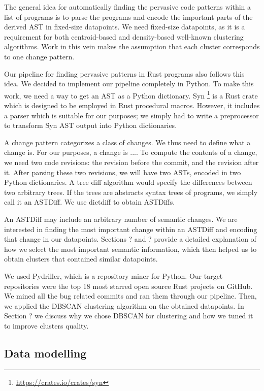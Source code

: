 The general idea for automatically finding the pervasive code patterns within a list of programs is to parse the programs and encode the important parts of the derived AST in fixed-size datapoints. We need fixed-size datapoints, as it is a requirement for both centroid-based and density-based well-known clustering algorithms. Work in this vein makes the assumption that each cluster corresponds to one change pattern.

Our pipeline for finding pervasive patterns in Rust programs also follows this idea. We decided to implement our pipeline completely in Python. To make this work, we need a way to get an AST as a Python dictionary. Syn \footnote{\url{https://crates.io/crates/syn}} is a Rust crate which is designed to be employed in Rust procedural macros. However, it includes a parser which is suitable for our purposes; we simply had to write a preprocessor to transform Syn AST output into Python dictionaries.

A change pattern categorizes a class of changes. We thus need to define what a change is. For our purposes, a change is ....
To compute the contents of a change, we need two code revisions: the revision before the commit, and the revision after it. After parsing these two revisions, we will have two ASTs, encoded in two Python dictionaries. A tree diff algorithm would specify the differences between two arbitrary trees. If the trees are abstracts syntax trees of programs, we simply call it an ASTDiff. We use dictdiff to obtain ASTDiffs.

An ASTDiff may include an arbitrary number of semantic changes. We are interested in finding the most important change within an ASTDiff and encoding that change in our datapoints. Sections ? and ? provide a detailed explanation of how we select the most important semantic information, which then helped us to obtain clusters that contained similar datapoints. 

We used Pydriller, which is a repository miner for Python. Our target repositories were the top 18 most starred open source Rust projects on GitHub. We mined all the bug related commits and ran them through our pipeline. Then, we applied the DBSCAN clustering algorithm on the obtained datapoints. In Section ? we discuss why we chose DBSCAN for clustering and how we tuned it to improve clusters quality. 

\subsection{Data modelling}

